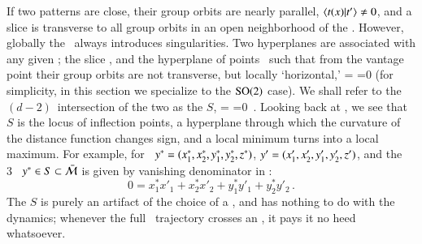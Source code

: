 \documentclass[preprint,12pt]{elsarticle} %
\begin{document}
If  two patterns are close, their group orbits are nearly parallel,
$\braket{\groupTan(\ssp)}{\sliceTan{}} \neq 0$, and a slice is transverse
to all group orbits in an open neighborhood of the {\template} \slicep.
However, globally the \mslices\ always introduces singularities. Two
hyperplanes are associated with  any given {\template} \slicep; the slice
, and the hyperplane of points \sspSing\ such that from
the {\template} vantage point their group orbits are not transverse, but
locally `horizontal,'
\beq
\braket{\groupTan(\sspSing)}{\sliceTan{}}
 =
\braket{\sspSing}{\Lg^2\slicep}
 =0
(for simplicity, in this section we specialize to the  $\SOn{2}$ case).
We shall refer to the $(d\!-\!2)$\dmn\ intersection of the two as the
{\em \sset} $S$,
\beq
\braket{\groupTan(\sspRSing)}{\sliceTan{}}
 =
\braket{\sspRSing}{\Lg^2\slicep}
 =0
\,.
Looking back at , we see that $S$ is the locus of
inflection points, a hyperplane through which the curvature of the
distance function changes sign, and a local minimum turns into a local
maximum.  For example, for \cLe\ $\sspRSing =
(x_1^*,x_2^*,y_1^*,y_2^*,z^*)$, $\slicep = (x_1',x_2',y_1',y_2',z')$, and
the 3\dmn\ {\sset} $\sspRSing \in S \subset \pSRed$ is given by vanishing
denominator in :
\[
0 = {x_1^* x'_1+x_2^* x'_2+y_1^* y'_1+y_2^* y'_2}
\,.
\]
The {\sset}  $S$ is purely an artifact of the choice of a {\template},
and has nothing to do with the dynamics; whenever the full \statesp\
trajectory crosses an {\sset}, it pays it no heed whatsoever.
\end{document}
